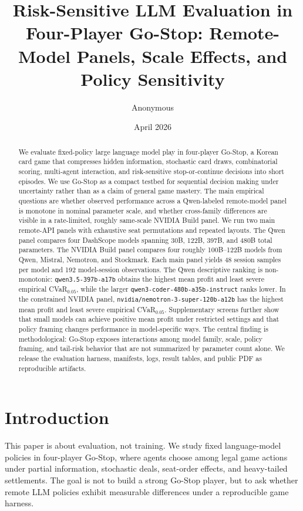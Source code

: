 \documentclass[11pt]{article}
\title{Risk-Sensitive LLM Evaluation in Four-Player Go-Stop: Remote-Model Panels, Scale Effects, and Policy Sensitivity}
\author{Anonymous}
\date{April 2026}
\begin{document}
\maketitle

\begin{abstract}
We evaluate fixed-policy large language model play in four-player Go-Stop, a Korean card game that compresses hidden information, stochastic card draws, combinatorial scoring, multi-agent interaction, and risk-sensitive stop-or-continue decisions into short episodes. We use Go-Stop as a compact testbed for sequential decision making under uncertainty rather than as a claim of general game mastery. The main empirical questions are whether observed performance across a Qwen-labeled remote-model panel is monotone in nominal parameter scale, and whether cross-family differences are visible in a rate-limited, roughly same-scale NVIDIA Build panel. We run two main remote-API panels with exhaustive seat permutations and repeated layouts. The Qwen panel compares four DashScope models spanning 30B, 122B, 397B, and 480B total parameters. The NVIDIA Build panel compares four roughly 100B--122B models from Qwen, Mistral, Nemotron, and Stockmark. Each main panel yields 48 session samples per model and 192 model-session observations. The Qwen descriptive ranking is non-monotonic: \texttt{qwen3.5-397b-a17b} obtains the highest mean profit and least severe empirical CVaR$_{0.05}$, while the larger \texttt{qwen3-coder-480b-a35b-instruct} ranks lower. In the constrained NVIDIA panel, \texttt{nvidia/nemotron-3-super-120b-a12b} has the highest mean profit and least severe empirical CVaR$_{0.05}$. Supplementary screens further show that small models can achieve positive mean profit under restricted settings and that policy framing changes performance in model-specific ways. The central finding is methodological: Go-Stop exposes interactions among model family, scale, policy framing, and tail-risk behavior that are not summarized by parameter count alone. We release the evaluation harness, manifests, logs, result tables, and public PDF as reproducible artifacts.
\end{abstract}

\section{Introduction}
This paper is about evaluation, not training. We study fixed language-model policies in four-player Go-Stop, where agents choose among legal game actions under partial information, stochastic deals, seat-order effects, and heavy-tailed settlements. The goal is not to build a strong Go-Stop player, but to ask whether remote LLM policies exhibit measurable differences under a reproducible game harness.
\end{document}
